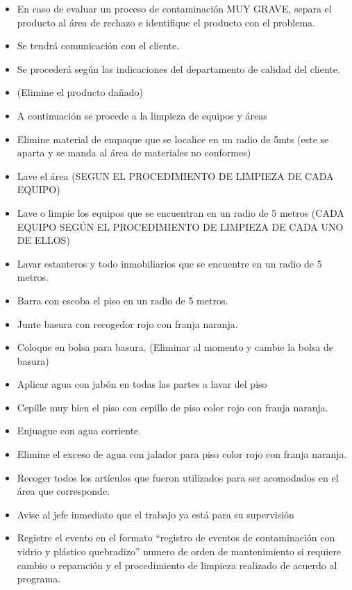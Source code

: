 \begin{itemize}
	\item En caso de evaluar un proceso de contaminación MUY GRAVE, separa el producto al área de rechazo e identifique el producto con el problema.
	\item Se tendrá comunicación con el cliente.
	\item Se procederá según las indicaciones del departamento de calidad del cliente.
	\item (Elimine el producto dañado)
	\item A continuación se procede a la limpieza de equipos y áreas
	\item Elimine material de empaque que se localice en un radio de 5mts (este se aparta y se manda al área de materiales no conformes)
	\item Lave el área (SEGUN EL PROCEDIMIENTO DE LIMPIEZA DE CADA EQUIPO)
	\item Lave o limpie los equipos que se encuentran en un radio de 5 metros (CADA EQUIPO SEGÚN EL PROCEDIMIENTO DE LIMPIEZA DE CADA UNO DE ELLOS)
	\item Lavar estanteros y todo inmobiliarios que se encuentre en un radio de 5 metros.
	\item Barra con escoba el piso en un radio de 5 metros.
	\item Junte basura con recogedor rojo con franja naranja.
	\item Coloque en bolsa para basura. (Eliminar al momento y cambie la bolsa de basura)
	\item Aplicar agua con jabón en todas las partes a lavar del piso
	\item Cepille muy bien el piso con cepillo de piso color rojo con franja naranja.
	\item Enjuague con agua corriente.
	\item Elimine el exceso de agua con jalador para piso color rojo con franja naranja.
	\item Recoger todos los artículos que fueron utilizados para ser acomodados en el área que corresponde.
	\item Avise al jefe inmediato que el trabajo ya está para su supervisión
	\item Registre el evento en el formato “registro de eventos de contaminación con vidrio y plástico quebradizo” numero de orden de mantenimiento si requiere cambio o reparación y el procedimiento de limpieza realizado de acuerdo al programa.
\end{itemize}

